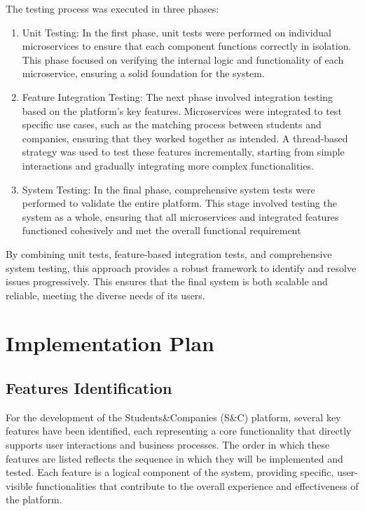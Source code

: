 The testing process was executed in three phases:
\begin{enumerate}
    \item Unit Testing: In the first phase, unit tests were performed on individual microservices to ensure
    that each component functions correctly in isolation. This phase focused on verifying the internal
    logic and functionality of each microservice, ensuring a solid foundation for the system.
    \item Feature Integration Testing: The next phase involved integration testing based on the
    platform's key features. Microservices were integrated to test specific use cases, such as the
    matching process between students and companies, ensuring that they worked together as intended.
    A thread-based strategy was used to test these features incrementally, starting from simple
    interactions and gradually integrating more complex functionalities.
    \item System Testing: In the final phase, comprehensive system tests were performed to validate
    the entire platform. This stage involved testing the system as a whole, ensuring that all
    microservices and integrated features functioned cohesively and met the overall functional requirement
\end{enumerate}    
 
By combining unit tests, feature-based integration tests, and comprehensive system testing,
this approach provides a robust framework to identify and resolve issues progressively.
This ensures that the final system is both scalable and reliable, meeting the diverse needs of its users.

\newpage
\section{Implementation Plan}
\subsection{Features Identification}

For the development of the Students\&Companies (S\&C) platform, several key features have been
identified, each representing a core functionality that directly supports user interactions
and business processes. The order in which these features are listed reflects the sequence
in which they will be implemented and tested. Each feature is a logical component of the system,
providing specific, user-visible functionalities that contribute to the overall experience and
effectiveness of the platform.

